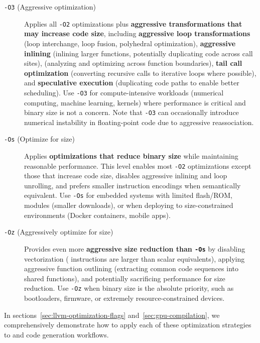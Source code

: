 \begin{description}
  \item[\texttt{-O3} (Aggressive optimization)] Applies all \texttt{-O2} optimizations plus \textbf{aggressive transformations that may increase code size}, including \textbf{aggressive loop transformations} (loop interchange, loop fusion, polyhedral optimization), \textbf{aggressive inlining} (inlining larger functions, potentially duplicating code across call sites), \textbf{} (analyzing and optimizing across function boundaries), \textbf{tail call optimization} (converting recursive calls to iterative loops where possible), and \textbf{speculative execution} (duplicating code paths to enable better scheduling). Use \texttt{-O3} for compute-intensive workloads (numerical computing, machine learning,  kernels) where performance is critical and binary size is not a concern. Note that \texttt{-O3} can occasionally introduce numerical instability in floating-point code due to aggressive reassociation.

  \item[\texttt{-Os} (Optimize for size)] Applies \textbf{optimizations that reduce binary size} while maintaining reasonable performance. This level enables most \texttt{-O2} optimizations except those that increase code size, disables aggressive inlining and loop unrolling, and prefers smaller instruction encodings when semantically equivalent. Use \texttt{-Os} for embedded systems with limited flash/ROM,  modules (smaller downloads), or when deploying to size-constrained environments (Docker containers, mobile apps).

  \item[\texttt{-Oz} (Aggressively optimize for size)] Provides even more \textbf{aggressive size reduction than \texttt{-Os}} by disabling vectorization ( instructions are larger than scalar equivalents), applying aggressive function outlining (extracting common code sequences into shared functions), and potentially sacrificing performance for size reduction. Use \texttt{-Oz} when binary size is the absolute priority, such as bootloaders, firmware, or extremely resource-constrained  devices.
\end{description}

In sections~\ref{sec:llvm-optimization-flags} and~\ref{sec:gpu-compilation}, we comprehensively demonstrate how to apply each of these optimization strategies to  and  code generation workflows.
